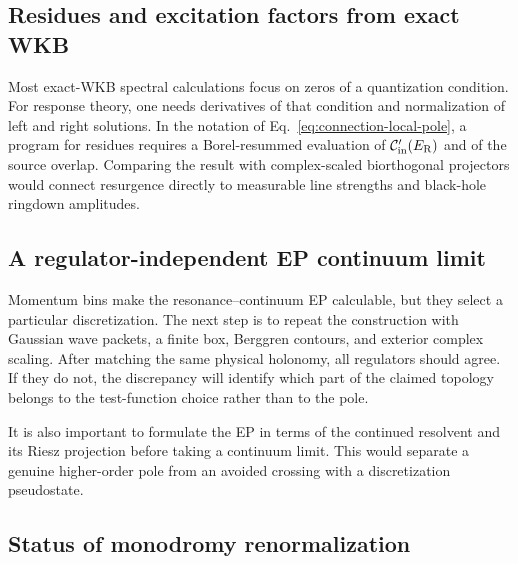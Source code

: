 \subsection{Residues and excitation factors from exact WKB}
\label{subsec:open-residues}

Most exact-WKB spectral calculations focus on zeros of a quantization
condition.  For response theory, one needs derivatives of that condition and
normalization of left and right solutions.  In the notation of
Eq.~\eqref{eq:connection-local-pole}, a program for residues requires a
Borel-resummed evaluation of $\mathcal{C}_{\mathrm{in}}'(E_{\mathrm{R}})$ and of the
source overlap.  Comparing the result with complex-scaled biorthogonal
projectors would connect resurgence directly to measurable line strengths and
black-hole ringdown amplitudes.

\subsection{A regulator-independent EP continuum limit}
\label{subsec:open-ep-limit}

Momentum bins make the resonance--continuum EP calculable, but they select a
particular discretization.  The next step is to repeat the construction with
Gaussian wave packets, a finite box, Berggren contours, and exterior complex
scaling.  After matching the same physical holonomy, all regulators should
agree.  If they do not, the discrepancy will identify which part of the
claimed topology belongs to the test-function choice rather than to the pole.

It is also important to formulate the EP in terms of the continued resolvent
and its Riesz projection before taking a continuum limit.  This would separate
a genuine higher-order pole from an avoided crossing with a discretization
pseudostate.

\subsection{Status of monodromy renormalization}
\label{subsec:open-monodromy-rg}

